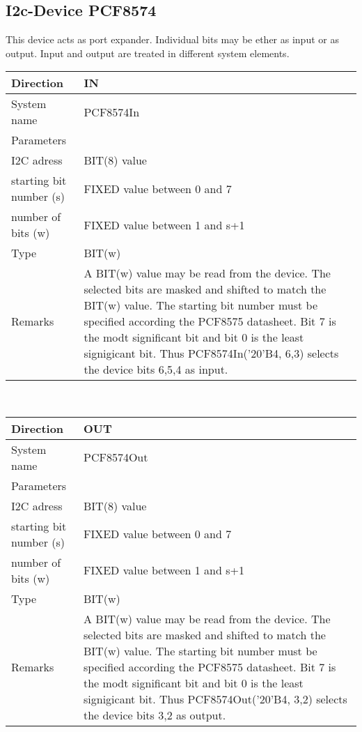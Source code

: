 \subsection{I2c-Device PCF8574}
This device acts as port expander. 
Individual bits may be ether as input or as output.
Input and output are treated in different system elements.

\begin{tabular}{|l|p{10cm}|}
\hline
Direction & IN \\
\hline
System name & PCF8574In \\
\hline
Parameters & \\
 I2C adress & BIT(8) value \\
  starting bit number (s) & FIXED value between 0 and 7 \\
   number of bits (w) & FIXED value between 1 and s+1 \\
\hline
Type & BIT(w) \\
\hline
Remarks& A BIT(w) value may be read from the device.
The selected bits are masked and shifted to match the BIT(w) value.
The starting bit number must be specified according the PCF8575 datasheet.
Bit 7 is the modt significant bit and bit 0 is the least signigicant bit.
Thus PCF8574In('20'B4, 6,3) selects the device bits 6,5,4 as input.
\\
\hline
\end{tabular}

\ \\

\begin{tabular}{|l|p{10cm}|}
\hline
Direction & OUT \\
\hline
System name & PCF8574Out \\
\hline
Parameters & \\
 I2C adress & BIT(8) value \\
  starting bit number (s) & FIXED value between 0 and 7 \\
   number of bits (w) & FIXED value between 1 and s+1 \\
\hline
Type & BIT(w) \\
\hline
Remarks& A BIT(w) value may be read from the device.
The selected bits are masked and shifted to match the BIT(w) value.
The starting bit number must be specified according the PCF8575 datasheet.
Bit 7 is the modt significant bit and bit 0 is the least signigicant bit.
Thus PCF8574Out('20'B4, 3,2) selects the device bits 3,2 as output.
\\
\hline
\end{tabular}


